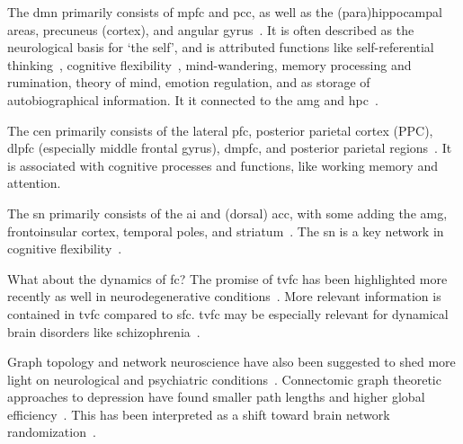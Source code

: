 The \gls{dmn} primarily consists of \gls{mpfc} and \gls{pcc}, as well as the (para)hippocampal areas, precuneus (cortex), and angular gyrus~\parencite{Andrews-Hanna2010}.
It is often described as the neurological basis for `the self', and is attributed functions like self-referential thinking~\parencite{Sheline2009}, cognitive flexibility~\parencite{Vatansever2016}, mind-wandering, memory processing and rumination, theory of mind, emotion regulation, and as storage of autobiographical information.
It it connected to the \gls{amg} and \gls{hpc}~\parencite{Andrews-Hanna2014}.

The \gls{cen} primarily consists of the lateral \gls{pfc}, posterior parietal cortex (PPC), \gls{dlpfc} (especially middle frontal gyrus), \gls{dmpfc}, and posterior parietal regions~\parencite{Rogers2004}.
It is associated with cognitive processes and functions, like working memory and attention.

The \gls{sn} primarily consists of the \gls{ai} and (dorsal) \gls{acc}, with some adding the \gls{amg}, frontoinsular cortex, temporal poles, and striatum~\parencite{Seeley2007, Menon2010, Beck2016}.
The \gls{sn} is a key network in cognitive flexibility~\parencite{Dajani2015}.

What about the dynamics of \gls{fc}?
The promise of \gls{tvfc} has been highlighted more recently as well in neurodegenerative conditions~\parencite{Filippi2019}.
More relevant information is contained in \gls{tvfc} compared to \gls{sfc}.
\gls{tvfc} may be especially relevant for dynamical brain disorders like schizophrenia~\parencite{Jin2017}.

Graph topology and network neuroscience have also been suggested to shed more light on neurological and psychiatric conditions~\parencite{Fornito2013}.
Connectomic graph theoretic approaches to depression have found smaller path lengths and higher global efficiency~\parencite{Zhang2011}.
This has been interpreted as a shift toward brain network randomization~\parencite{Gong2015}.
